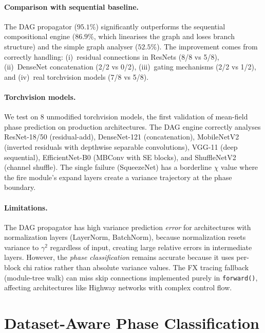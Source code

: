 \documentclass[10pt]{article}
\begin{document}
\paragraph{Comparison with sequential baseline.}
The DAG propagator ($95.1\%$) significantly outperforms the sequential compositional engine ($86.9\%$, which linearises the graph and loses branch structure) and the simple graph analyser ($52.5\%$).
The improvement comes from correctly handling: (i)~residual connections in ResNets (8/8 vs 5/8), (ii)~DenseNet concatenation (2/2 vs 0/2), (iii)~gating mechanisms (2/2 vs 1/2), and (iv)~real torchvision models (7/8 vs 5/8).

\paragraph{Torchvision models.}
We test on 8 unmodified torchvision models, the first validation of mean-field phase prediction on production architectures.
The DAG engine correctly analyses ResNet-18/50 (residual-add), DenseNet-121 (concatenation), MobileNetV2 (inverted residuals with depthwise separable convolutions), VGG-11 (deep sequential), EfficientNet-B0 (MBConv with SE blocks), and ShuffleNetV2 (channel shuffle).
The single failure (SqueezeNet) has a borderline $\chi$ value where the fire module's expand layers create a variance trajectory at the phase boundary.

\paragraph{Limitations.}
The DAG propagator has high variance prediction \emph{error} for architectures with normalization layers (LayerNorm, BatchNorm), because normalization resets variance to $\gamma^2$ regardless of input, creating large relative errors in intermediate layers.
However, the \emph{phase classification} remains accurate because it uses per-block chi ratios rather than absolute variance values.
The FX tracing fallback (module-tree walk) can miss skip connections implemented purely in \texttt{forward()}, affecting architectures like Highway networks with complex control flow.

\section{Dataset-Aware Phase Classification}
\label{sec:data-aware}
\end{document}
